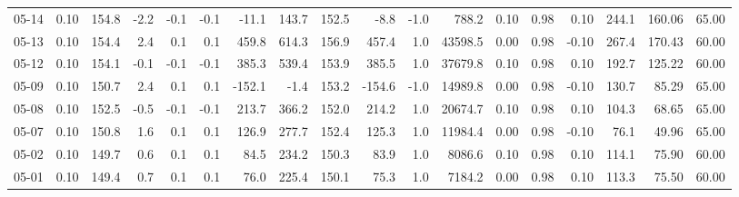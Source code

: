 \begin{threeparttable}
{\begin{tabular}{lrrrrrrrrrrrrrrrrr}
  05-14 &     0.10 & 154.8 &              -2.2 &              -0.1 &               -0.1 &              -11.1 &  143.7 & 152.5 &       -8.8 &                     -1.0 &               788.2 &       0.10 &      0.98 &           0.10 &            244.1 &          160.06 &                  65.00 \\
  05-13 &     0.10 & 154.4 &               2.4 &               0.1 &                0.1 &              459.8 &  614.3 & 156.9 &      457.4 &                      1.0 &             43598.5 &       0.00 &      0.98 &          -0.10 &            267.4 &          170.43 &                  60.00 \\
  05-12 &     0.10 & 154.1 &              -0.1 &              -0.1 &               -0.1 &              385.3 &  539.4 & 153.9 &      385.5 &                      1.0 &             37679.8 &       0.10 &      0.98 &           0.10 &            192.7 &          125.22 &                  60.00 \\
  05-09 &     0.10 & 150.7 &               2.4 &               0.1 &                0.1 &             -152.1 &   -1.4 & 153.2 &     -154.6 &                     -1.0 &             14989.8 &       0.00 &      0.98 &          -0.10 &            130.7 &           85.29 &                  65.00 \\
  05-08 &     0.10 & 152.5 &              -0.5 &              -0.1 &               -0.1 &              213.7 &  366.2 & 152.0 &      214.2 &                      1.0 &             20674.7 &       0.10 &      0.98 &           0.10 &            104.3 &           68.65 &                  65.00 \\
  05-07 &     0.10 & 150.8 &               1.6 &               0.1 &                0.1 &              126.9 &  277.7 & 152.4 &      125.3 &                      1.0 &             11984.4 &       0.00 &      0.98 &          -0.10 &             76.1 &           49.96 &                  65.00 \\
  05-02 &     0.10 & 149.7 &               0.6 &               0.1 &                0.1 &               84.5 &  234.2 & 150.3 &       83.9 &                      1.0 &              8086.6 &       0.10 &      0.98 &           0.10 &            114.1 &           75.90 &                  60.00 \\
  05-01 &     0.10 & 149.4 &               0.7 &               0.1 &                0.1 &               76.0 &  225.4 & 150.1 &       75.3 &                      1.0 &              7184.2 &       0.00 &      0.98 &           0.10 &            113.3 &           75.50 &                  60.00 \\

\end{tabular}}
\end{threeparttable}
